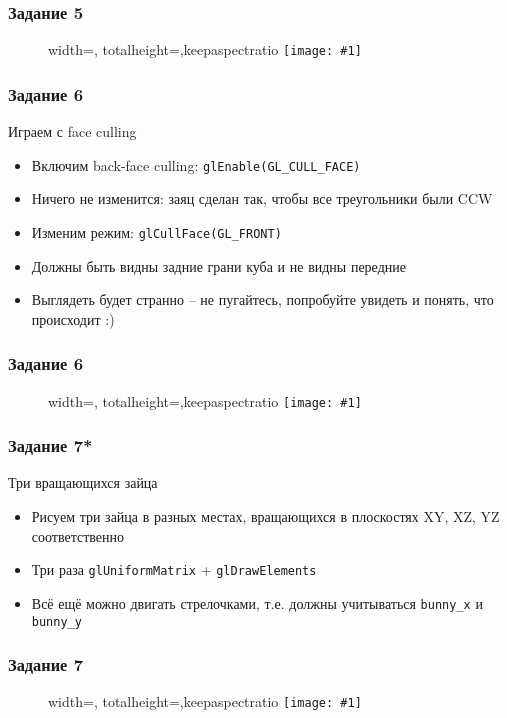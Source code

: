 \documentclass{beamer}
\newcommand{\slideimage}[1]{
  \begin{figure}
    \begin{adjustbox}{width=\textwidth, totalheight=\textheight-2\baselineskip-2\baselineskip,keepaspectratio}
      \texttt{[image: \#1]}
    \end{adjustbox}
  \end{figure}
}
\begin{document}
\begin{frame}[fragile]
\frametitle{Задание 5}
\slideimage{5.png}
\end{frame}

\begin{frame}[fragile]
\frametitle{Задание 6}
Играем с face culling
\begin{itemize}
\item Включим back-face culling: \verb|glEnable(GL_CULL_FACE)|
\item Ничего не изменится: заяц сделан так, чтобы все треугольники были CCW
\item Изменим режим: \verb|glCullFace(GL_FRONT)|
\item Должны быть видны задние грани куба и не видны передние
\item Выглядеть будет странно -- не пугайтесь, попробуйте увидеть и понять, что происходит :)
\end{itemize}
\end{frame}

\begin{frame}[fragile]
\frametitle{Задание 6}
\slideimage{6.png}
\end{frame}

\begin{frame}[fragile]
\frametitle{Задание 7*}
Три вращающихся зайца
\begin{itemize}
\item Рисуем три зайца в разных местах, вращающихся в плоскостях XY, XZ, YZ соответственно
\item Три раза \verb|glUniformMatrix| + \verb|glDrawElements|
\item Всё ещё можно двигать стрелочками, т.е. должны учитываться \verb|bunny_x| и \verb|bunny_y|
\end{itemize}
\end{frame}

\begin{frame}[fragile]
\frametitle{Задание 7}
\slideimage{7.png}
\end{frame}
\end{document}

